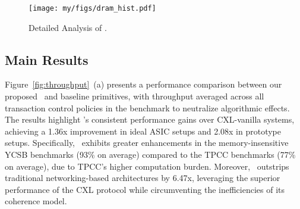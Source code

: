 

\begin{figure}[t]
  \centering
  \texttt{[image: my/figs/dram\_hist.pdf]}
  \caption{Detailed Analysis of \name.}
  \label{fig:dram_hist}
\end{figure}

\subsection{Main Results}

Figure~\ref{fig:throughput}~(a) presents a performance comparison between our proposed \name~and baseline primitives, with throughput averaged across all transaction control policies in the benchmark to neutralize algorithmic effects. The results highlight \name's consistent performance gains over CXL-vanilla systems, achieving a 1.36x improvement in ideal ASIC setups and 2.08x in prototype setups. Specifically, \name~exhibits greater enhancements in the memory-insensitive YCSB benchmarks (93\% on average) compared to the TPCC benchmarks (77\% on average), due to TPCC's higher computation burden. Moreover, \name~outstrips traditional networking-based architectures by 6.47x, leveraging the superior performance of the CXL protocol while circumventing the inefficiencies of its coherence model. 




